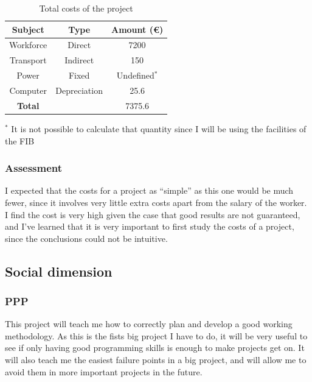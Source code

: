 \documentclass[a4paper]{article}
\begin{document}
            \begin{table}
                \centering
                \begin{tabular}{|c|c|c|}
                    \hline
                    \textbf{Subject} & \textbf{Type} & \textbf{Amount (€)} \\
                    \hline
                    \hline
                    Workforce & Direct & 7200 \\
                    \hline
                    Transport & Indirect & 150 \\
                    \hline
                    Power & Fixed & Undefined$^*$ \\
                    \hline
                    Computer & Depreciation & 25.6 \\
                    \hline
                    \textbf{Total} & & 7375.6 \\
                    \hline
                \end{tabular}
                \caption{Total costs of the project}
                \label{Tab:2}
                $^*$ It is not possible to calculate that quantity since I will be using the facilities of the FIB
            \end{table}

            \subsubsection{Assessment}
            I expected that the costs for a project as ``simple'' as this one would be much fewer, since it involves very little extra costs apart from the salary of the worker. I find the cost is very high given the case that good results are not guaranteed, and I've learned that it is very important to first study the costs of a project, since the conclusions could not be intuitive.




        \subsection{Social dimension}
            \subsubsection{PPP}
                This project will teach me how to correctly plan and develop a good working methodology. As this is the fists big project I have to do, it will be very useful to see if only having good programming skills is enough to make projects get on. It will also teach me the easiest failure points in a big project, and will allow me to avoid them in more important projects in the future.
\end{document}
